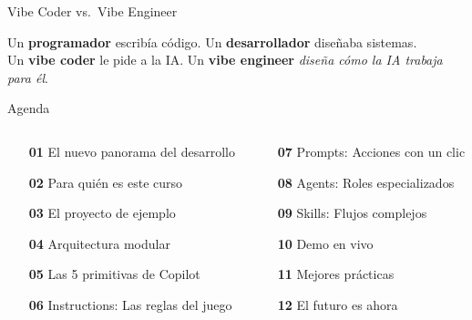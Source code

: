 \documentclass[aspectratio=169,11pt]{beamer}
\begin{document}
\begin{frame}{Vibe Coder vs.\ Vibe Engineer}
  \vspace{0.2em}
  \begin{quoteblock}[top=3pt, bottom=3pt]
    \small Un \textbf{programador} escrib\'ia c\'odigo. Un \textbf{desarrollador} dise\~naba sistemas.\\
    Un \textbf{vibe coder} le pide a la IA. Un \textbf{vibe engineer} \textit{dise\~na c\'omo la IA trabaja para \'el}.
  \end{quoteblock}
\end{frame}

\begin{frame}{Agenda}
  \begin{columns}[T]
    \begin{column}{0.48\textwidth}
      \begin{enumerate}
        \item[\textcolor{ixtiGreen}{\textbf{01}}] El nuevo panorama del desarrollo
        \item[\textcolor{ixtiGreen}{\textbf{02}}] Para qui\'en es este curso
        \item[\textcolor{ixtiGreen}{\textbf{03}}] El proyecto de ejemplo
        \item[\textcolor{ixtiGreen}{\textbf{04}}] Arquitectura modular
        \item[\textcolor{ixtiGreen}{\textbf{05}}] Las 5 primitivas de Copilot
        \item[\textcolor{ixtiGreen}{\textbf{06}}] Instructions: Las reglas del juego
      \end{enumerate}
    \end{column}
    \begin{column}{0.48\textwidth}
      \begin{enumerate}
        \item[\textcolor{ixtiGreen}{\textbf{07}}] Prompts: Acciones con un clic
        \item[\textcolor{ixtiGreen}{\textbf{08}}] Agents: Roles especializados
        \item[\textcolor{ixtiGreen}{\textbf{09}}] Skills: Flujos complejos
        \item[\textcolor{ixtiGreen}{\textbf{10}}] Demo en vivo
        \item[\textcolor{ixtiGreen}{\textbf{11}}] Mejores pr\'acticas
        \item[\textcolor{ixtiGreen}{\textbf{12}}] El futuro es ahora
      \end{enumerate}
    \end{column}
  \end{columns}
\end{frame}
\end{document}
